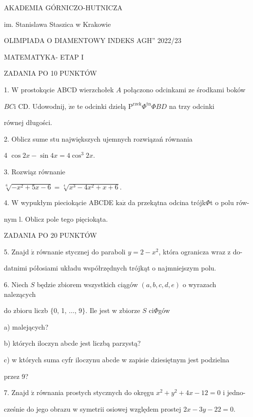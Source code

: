 \documentclass[a4paper,12pt]{article}
\begin{document}
AKADEMIA GÓRNICZO-HUTNICZA

im. Stanislawa Staszica w Krakowie

OLIMPIADA O DIAMENTOWY INDEKS AGH'' 2022/23

MATEMATYKA- ETAP I

ZADANIA PO 10 PUNKTÓW

1. $\mathrm{W}$ prostokqcie ABCD wierzchołek $A$ połączono odcinkami ze środkami boków

$BC \mathrm{i}$ CD. Udowodnij, $\dot{\mathrm{z}}\mathrm{e}$ te odcinki dzielą $\mathrm{P}^{\mathrm{r}\mathrm{z}\mathrm{e}\mathrm{k}}\Phi^{\mathrm{t}\mathrm{n}}\Phi BD$ na trzy odcinki

równej długości.

2. Oblicz sume stu największych ujemnych rozwiązań równania

4 $\cos 2x-\sin 4x=4\cos^{3}2x.$

3. Rozwiąz równanie

$\sqrt[6]{-x^{2}+5x-6}=\sqrt[4]{x^{3}-4x^{2}+x+6}.$

4. $\mathrm{W}$ wypukłym pieciokącie ABCDE $\mathrm{k}\mathrm{a}\dot{\mathrm{z}}$ da przekątna odcina trójk$\Phi$t o polu rów-

nym l. Oblicz pole tego pięciokąta.

ZADANIA PO 20 PUNKTÓW

5. Znajd $\acute{\mathrm{z}}$ równanie stycznej do paraboli $y=2-x^{2}$, która ogranicza wraz z do-

datnimi półosiami układu współrzędnych trójkąt o najmniejszym polu.

6. Niech $S$ będzie zbiorem wszystkich ciągów $(a,b,c,d,e)$ o wyrazach nalezących

do zbioru liczb $\{0$, 1, $\ldots$, 9$\}$. Ile jest w zbiorze $S$ ci$\Phi$gów

a) malejących?

b) których iloczyn abcde jest liczbą parzystą?

c) w których suma cyfr iloczynu abcde w zapisie dziesiętnym jest podzielna

przez 9?

7. Znajd $\acute{\mathrm{z}}$ równania prostych stycznych do okręgu $x^{2}+y^{2}+4x-12=0$ i jedno-

cześnie do jego obrazu w symetrii osiowej względem prostej $2x-3y-22=0.$
\end{document}
